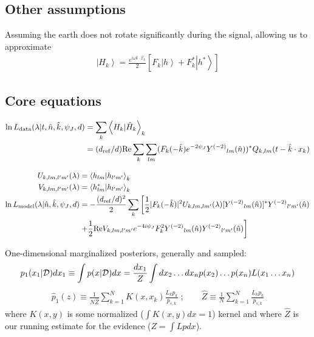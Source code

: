 \documentclass[twocolumn,prd,nofootinbib]{revtex4}
\newcommand\Y[1]{Y^{(#1)}{}}
\newcommand\qmstate[1]{\left|#1\right \rangle}
\newcommand\qmstateproduct[2]{\left\langle#1|#2\right\rangle}
\begin{document}
\subsection{Other assumptions}
Assuming the earth does not rotate significantly during the signal, allowing us to approximate
\begin{eqnarray}
\qmstate{H_k} = \frac{e^{i\omega \hat{k}\cdot \vec{x}_k}}{2}\left[ 
   F_k  \qmstate{h} + F_k^* \qmstate{h^*} 
 \right]
\end{eqnarray}


\begin{widetext}
\subsection{Core equations}

\begin{align}
\ln L_{\rm data}(\lambda|t,\hat{n},\hat{k},\psi_J,d) &=  \sum_k\qmstateproduct{H_k}{\hat{H}_k}_k \nonumber \\
\label{eq:Implementation:lnLData}
&= (d_{\rm ref}/d) \text{Re} \sum_k \sum_{lm}(F_k(-\hat{k}) e^{-2\psi_J} \Y{-2}_{lm}(\hat{n}))^* Q_{k,lm}(t-\hat{k}\cdot x_k)
\end{align}

\begin{subequations}
\label{eq:ComputeRhoViaInnerProductMatrix}
\begin{align}
{ U_{k,lm,l'm'}(\lambda)}& = \qmstateproduct{h_{lm}}{h_{l'm'}}_k \\
V_{k,lm,l'm'}(\lambda)& = \qmstateproduct{h_{lm}^*}{h_{l'm'}}_k \\
\ln L_{\rm model}(\lambda|\hat{n},\hat{k},\psi_J,d) &=
   -\frac{(d_{\rm ref}/d)^2}{2}\sum_k
\left[
{
 \frac{1}{2}|F_k(-\hat{k})|^2 U_{k,lm,lm'}(\lambda)[\Y{-2}_{lm}(\hat{n})]^*\Y{-2}_{l'm'}(\hat{n})
}
 \right. \nonumber \\ & \left.
 {
+
 \frac{1}{2} \text{Re} V_{k,lm,l'm'} e^{-4i\psi_J}F_k^2 \Y{-2}_{lm}(\hat{n})\Y{-2}_{l'm'}(\hat{n})
}
\right]
\end{align}
\end{subequations}


One-dimensional marginalized posteriors, generally and sampled: 
\begin{eqnarray}
p_1(x_1|{\cal D}) dx_1 \equiv \int p(x|{\cal D}) dx = \frac{dx_1}{Z} \int dx_{2}\ldots dx_n p(x_2)\ldots p(x_n)L(x_1\ldots x_n) 
\end{eqnarray}
\begin{eqnarray}
\hat{p}_1(z) \equiv \frac{1}{N \hat{Z}}\sum_{k=1}^N K(x,x_k) \frac{L_k p_k}{p_{s,k}} 
\; ; \qquad
\hat{Z} \equiv \frac{1}{N} \sum_{k=1}^N \frac{L_k p_k}{p_{s,k}}
\end{eqnarray}
where $K(x,y)$ is some normalized ($\int K(x,y) dx = 1$) kernel  and where $\hat{Z}$ is our running
estimate for the evidence ($Z = \int L p dx$).


\end{widetext}
\end{document}
